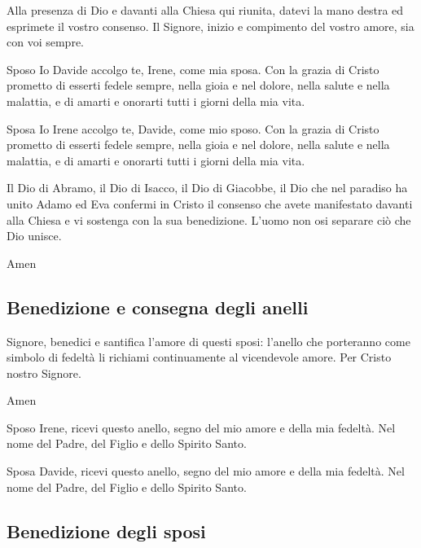 \begin{dialoghi}
\item[\sacerdote] Alla presenza di Dio e davanti alla Chiesa qui riunita, datevi la mano destra ed esprimete il vostro consenso. Il Signore, inizio e compimento del vostro amore, sia con voi sempre.
\item[Sposo] Io Davide accolgo te, Irene, come mia sposa. Con la grazia di Cristo prometto di esserti fedele sempre, nella gioia e nel dolore, nella salute e nella malattia, e di amarti e onorarti tutti i giorni della mia vita.
\item[Sposa] Io Irene accolgo te, Davide, come mio sposo. Con la grazia di Cristo prometto di esserti fedele sempre, nella gioia e nel dolore, nella salute e nella malattia, e di amarti e onorarti tutti i giorni della mia vita.
\item[\sacerdote] Il Dio di Abramo, il Dio di Isacco, il Dio di Giacobbe, il Dio che nel paradiso ha unito Adamo ed Eva confermi in Cristo il consenso che avete manifestato davanti alla Chiesa e vi sostenga con la sua benedizione. L'uomo non osi separare ciò che Dio unisce.
\item[\assemblea] Amen
\end{dialoghi}

\subsection*{Benedizione e consegna degli anelli}

\begin{dialoghi}
\item[\sacerdote] Signore, benedici e santifica l'amore di questi sposi: l'anello che porteranno come simbolo di fedeltà li richiami continuamente al vicendevole amore. Per Cristo nostro Signore.
\item[\assemblea] Amen
\item[Sposo] Irene, ricevi questo anello, segno del mio amore e della mia fedeltà. Nel nome del Padre, del Figlio e dello Spirito Santo.
\item[Sposa] Davide, ricevi questo anello, segno del mio amore e della mia fedeltà. Nel nome del Padre, del Figlio e dello Spirito Santo.
\end{dialoghi}

\subsection*{Benedizione degli sposi}

